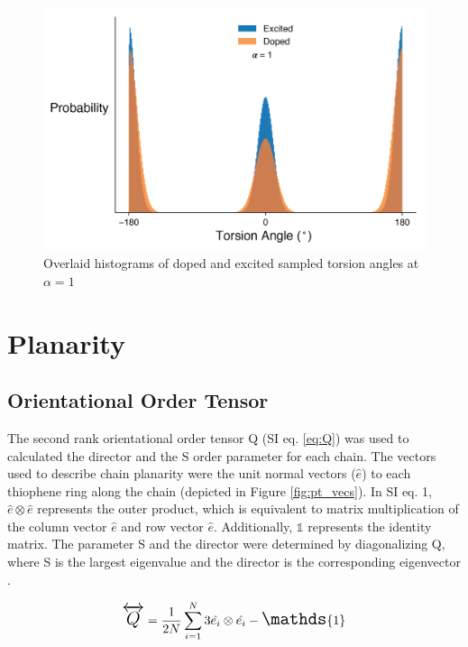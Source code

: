 \begin{figure}[hbt!]
    \centering
    \includegraphics{figures/append_tor_model/a_1_hist.png}
    \caption[Histogram of Doped and Excited Sampled Torsion Angles at $\alpha = 1$]{Overlaid histograms of doped and excited sampled torsion angles at $\alpha = 1$}
    \label{fig:a_1_hist}
\end{figure}

\clearpage
\section{Planarity}
\label{sec:planarity}
\subsection{Orientational Order Tensor}

The second rank orientational order tensor Q (SI eq. \ref{eq:Q}) was used to calculated the director and the S order parameter for each chain. The vectors used to describe chain planarity were the unit normal vectors ($\hat{e}$) to each thiophene ring along the chain (depicted in Figure \ref{fig:pt_vecs}). In SI eq. 1, $\hat{e} \otimes \hat{e}$ represents the outer product, which is equivalent to matrix multiplication of the column vector $\hat{e}$ and row vector $\hat{e}$. Additionally, $\mathds{1}$ represents the identity matrix. The parameter S and the director were determined by diagonalizing Q, where S is the largest eigenvalue and the director is the corresponding eigenvector \cite{Allen2017}.

\begin{equation}
\Large
\overleftrightarrow{Q} = \frac{1}{2N} \sum_{i=1}^{N} 3\hat{e_i} \otimes \hat{e_i} - \mathds{1}
\label{eq:Q}
\end{equation}
